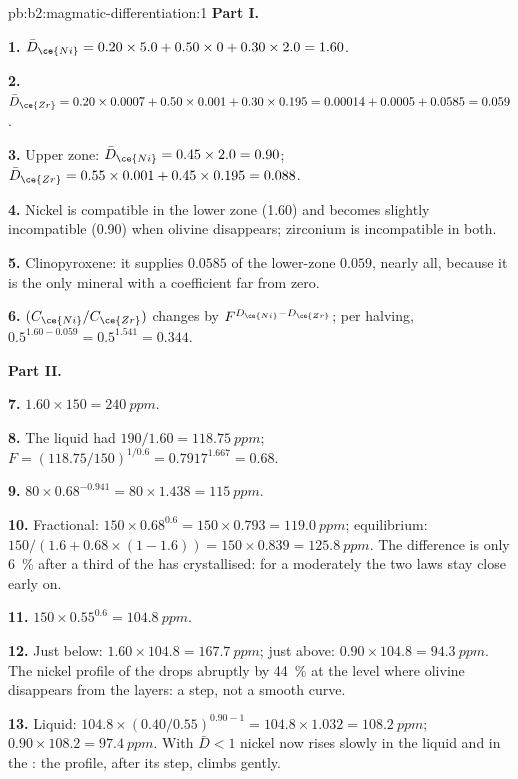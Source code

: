 \begin{solution}{pb:b2:magmatic-differentiation:1}
\noindent\textbf{Part I.}

\textbf{1.} $\bar D_{\ce{Ni}} = 0.20\times5.0 + 0.50\times0 + 0.30\times2.0 = 1.60$.

\textbf{2.} $\bar D_{\ce{Zr}} = 0.20\times0.0007 + 0.50\times0.001 + 0.30\times0.195 =
0.00014 + 0.0005 + 0.0585 = 0.059$.

\textbf{3.} Upper zone: $\bar D_{\ce{Ni}} = 0.45\times2.0 = 0.90$; $\bar D_{\ce{Zr}} =
0.55\times0.001 + 0.45\times0.195 = 0.088$.

\textbf{4.} Nickel is compatible in the lower zone (1.60) and becomes slightly
incompatible (0.90) when olivine disappears; zirconium is incompatible in both.

\textbf{5.} Clinopyroxene: it supplies $0.0585$ of the lower-zone $0.059$, nearly
all, because it is the only mineral with a coefficient far from zero.

\textbf{6.} $(C_{\ce{Ni}}/C_{\ce{Zr}})$ changes by $F^{D_{\ce{Ni}} - D_{\ce{Zr}}}$;
per halving, $0.5^{1.60 - 0.059} = 0.5^{1.541} = 0.344$.

\noindent\textbf{Part II.}

\textbf{7.} $1.60\times150 = \qty{240}{ppm}$.

\textbf{8.} The liquid had $190/1.60 = \qty{118.75}{ppm}$; $F = (118.75/150)^{1/0.6} =
0.7917^{1.667} = 0.68$.

\textbf{9.} $80\times0.68^{-0.941} = 80\times1.438 = \qty{115}{ppm}$.

\textbf{10.} Fractional: $150\times0.68^{0.6} = 150\times0.793 = \qty{119.0}{ppm}$;
equilibrium: $150/(1.6 + 0.68\times(1 - 1.6)) = 150\times0.839 = \qty{125.8}{ppm}$.
The difference is only \qty{6}{\percent} after a third of the  has
crystallised: for a moderately  the two laws stay close early on.

\textbf{11.} $150\times0.55^{0.6} = \qty{104.8}{ppm}$.

\textbf{12.} Just below: $1.60\times104.8 = \qty{167.7}{ppm}$; just above:
$0.90\times104.8 = \qty{94.3}{ppm}$. The nickel profile of the  drops
abruptly by \qty{44}{\percent} at the level where olivine disappears from the
layers: a step, not a smooth curve.

\textbf{13.} Liquid: $104.8\times(0.40/0.55)^{0.90 - 1} = 104.8\times1.032 =
\qty{108.2}{ppm}$;  $0.90\times108.2 = \qty{97.4}{ppm}$. With $\bar D < 1$
nickel now rises slowly in the liquid and in the : the profile, after its
step, climbs gently.


\end{solution}
